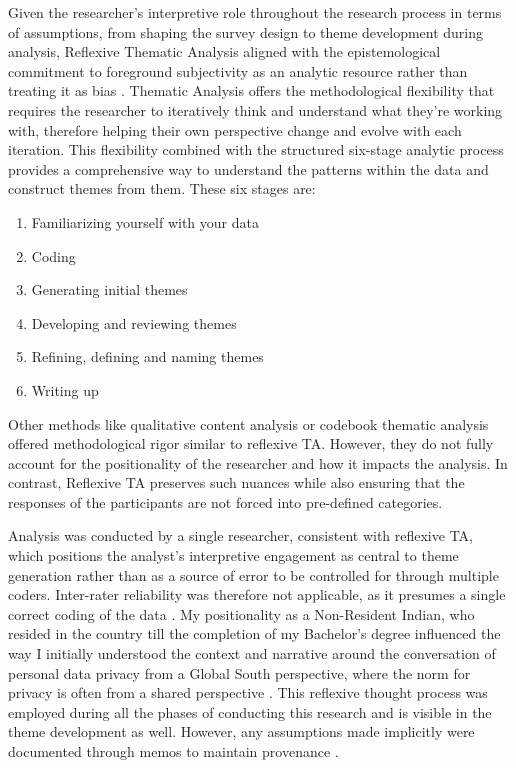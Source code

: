 Given the researcher's interpretive role throughout the research process in terms of assumptions, from shaping the survey design to theme development during analysis, Reflexive Thematic Analysis aligned with the epistemological commitment to foreground subjectivity as an analytic resource rather than treating it as bias \cite{braun_using_2006, braun_reflecting_2019}. Thematic Analysis offers the methodological flexibility that requires the researcher to iteratively think and understand what they're working with, therefore helping their own perspective change and evolve with each iteration. This flexibility combined with the structured six-stage analytic process provides a comprehensive way to understand the patterns within the data and construct themes from them. These six stages are: 
\begin{enumerate}
    \item Familiarizing yourself with your data
    \item Coding
    \item Generating initial themes
    \item Developing and reviewing themes
    \item Refining, defining and naming themes
    \item Writing up
\end{enumerate}

Other methods like qualitative content analysis \cite{hsieh2005three} or codebook thematic analysis  offered methodological rigor similar to reflexive TA. However, they do not fully account for the positionality of the researcher and how it impacts the analysis. In contrast, Reflexive TA preserves such nuances while also ensuring that the responses of the participants are not forced into pre-defined categories. 

Analysis was conducted by a single researcher, consistent with reflexive TA, which positions the analyst’s interpretive engagement as central to theme generation rather than as a source of error to be controlled for through multiple coders. Inter-rater reliability was therefore not applicable, as it presumes a single correct coding of the data \cite{mcdonald2019reliability, braun2021one}. My positionality as a Non-Resident Indian, who resided in the country till the completion of my Bachelor's degree influenced the way I initially understood the context and narrative around the conversation of personal data privacy from a Global South perspective, where the norm for privacy is often from a shared perspective \cite{sambasivan_privacy_nodate}. This reflexive thought process was employed during all the phases of conducting this research and is visible in the theme development as well. However, any assumptions made implicitly were documented through memos to maintain provenance \cite{braun2021one}.     

